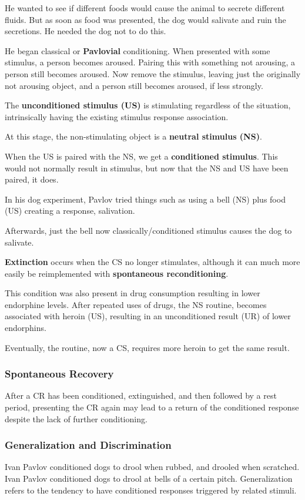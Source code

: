 \documentclass[12pt]{article}
\begin{document}
He wanted to see if different foods would cause the animal to secrete different fluids. But as soon as food was presented, the dog would salivate and ruin the secretions. He needed the dog not to do this.

He began classical or \textbf{Pavlovial} conditioning. When presented with some stimulus, a person becomes aroused. Pairing this with something not arousing, a person still becomes aroused. Now remove the stimulus, leaving just the originally not arousing object, and a person still becomes aroused, if less strongly.

The \textbf{unconditioned stimulus (US)} is stimulating regardless of the situation, intrinsically having the existing stimulus response association.

At this stage, the non-stimulating object is a \textbf{neutral stimulus (NS)}. 

When the US is paired with the NS, we get a \textbf{conditioned stimulus}. This would not normally result in stimulus, but now that the NS and US have been paired, it does.

In his dog experiment, Pavlov tried things such as using a bell (NS) plus food (US) creating a response, salivation.

Afterwards, just the bell now classically/conditioned stimulus causes the dog to salivate. 

\textbf{Extinction} occurs when the CS no longer stimulates, although it can much more easily be reimplemented with \textbf{spontaneous reconditioning}. 

This condition was also present in drug consumption resulting in lower endorphine levels. After repeated uses of drugs, the NS routine, becomes associated with heroin (US), resulting in an unconditioned result (UR) of lower endorphins.

Eventually, the routine, now a CS, requires more heroin to get the same result.

\subsubsection*{Spontaneous Recovery}
After a CR has been conditioned, extinguished, and then followed by a rest period, presenting the CR again may lead to a return of the conditioned response despite the lack of further conditioning.

\subsubsection*{Generalization and Discrimination}
Ivan Pavlov conditioned dogs to drool when rubbed, and drooled when scratched. Ivan Pavlov conditioned dogs to drool at bells of a certain pitch. Generalization refers to the tendency to have conditioned responses triggered by related stimuli.
\end{document}
